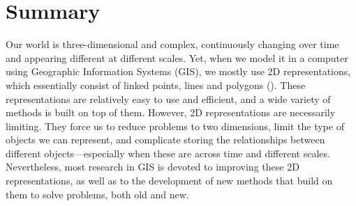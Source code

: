 
\chapter{Summary}

Our world is three-dimensional and complex, continuously changing over time and appearing different at different scales.
Yet, when we model it in a computer using Geographic Information Systems (GIS), we mostly use 2D representations, which essentially consist of linked points, lines and polygons ().
These representations are relatively easy to use and efficient, and a wide variety of methods is built on top of them.
However, 2D representations are necessarily limiting.
They force us to reduce problems to two dimensions, limit the type of objects we can represent, and complicate storing the relationships between different objects---especially when these are across time and different scales.
Nevertheless, most research in GIS is devoted to improving these 2D representations, as well as to the development of new methods that build on them to solve problems, both old and new.

